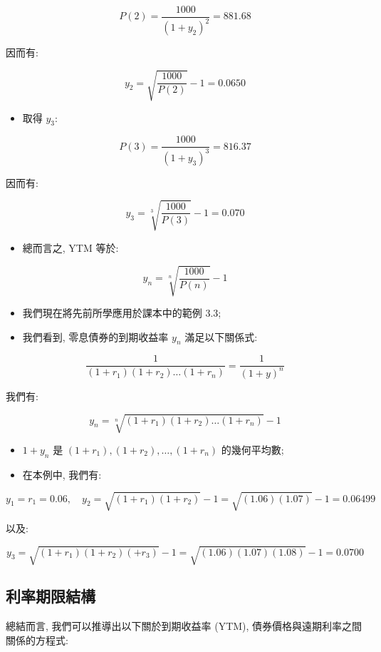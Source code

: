 \documentclass[letterpaper]{article}
\begin{document}
		$$
		P (2) =\frac{1000}{\left (1+y_{2}\right) ^{2}}=881.68
		$$
		
		因而有: 
		
		$$
		y_{2}=\sqrt{\frac{1000}{P (2) }}-1=0.0650
		$$
		
		\begin{itemize}
			\item 取得 $y_{3}$: 
		\end{itemize}
		
		$$
		P (3) =\frac{1000}{\left (1+y_{3}\right) ^{3}}=816.37
		$$
		
		因而有: 
		
		$$
		y_{3}=\sqrt[3]{\frac{1000}{P (3) }}-1=0.070
		$$
		
		\begin{itemize}
			\item 總而言之, YTM 等於: 
		\end{itemize}
		
		$$
		y_{n}=\sqrt[n]{\frac{1000}{P (n) }}-1
		$$
		
		\begin{itemize}
			\item 我們現在將先前所學應用於課本中的範例 3.3; 
			\item 我們看到, 零息債券的到期收益率 $y_{n}$ 滿足以下關係式: 
		\end{itemize}
		
		
		$$
		\frac{1}{\left (1+r_{1}\right) \left (1+r_{2}\right) \ldots\left (1+r_{n}\right) }=\frac{1}{ (1+y) ^{n}}
		$$
		
		我們有: 
		
		$$
		y_{n}=\sqrt[n]{\left (1+r_{1}\right) \left (1+r_{2}\right) \ldots\left (1+r_{n}\right) }-1
		$$
		
		\begin{itemize}
			\item $1 + y_{n}$ 是 $\left (1 + r_{1}\right), \left (1 + r_{2}\right), \ldots, \left (1 + r_{n}\right) $ 的幾何平均數; 
			\item 在本例中, 我們有: 
		\end{itemize}
		
		
		$$
		y_{1}=r_{1}=0.06, \quad y_{2}=\sqrt{\left (1+r_{1}\right) \left (1+r_{2}\right) }-1=\sqrt{ (1.06)  (1.07) }-1=0.06499
		$$
		
		以及: 
		
		$$
		y_{3}=\sqrt{\left (1+r_{1}\right) \left (1+r_{2}\right) \left (+r_{3}\right) }-1=\sqrt{ (1.06)  (1.07)  (1.08) }-1=0.0700
		$$
		
		\subsection{利率期限結構}
		總結而言, 我們可以推導出以下關於到期收益率 (YTM), 債券價格與遠期利率之間關係的方程式: 
		
\end{document}
